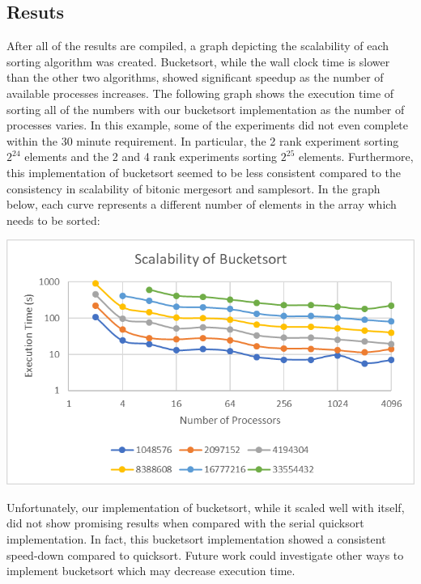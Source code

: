 \documentclass[10pt,letterpaper]{article}
\begin{document}
\begin{multicols}{2}
\section{Resuts}
After all of the results are compiled, a graph depicting the scalability of each sorting algorithm was created. Bucketsort, while the wall clock time is slower than the other two algorithms, showed significant speedup as the number of available processes increases. The following graph shows the execution time of sorting all of the numbers with our bucketsort implementation as the number of processes varies. In this example, some of the experiments did not even complete within the 30 minute requirement. In particular, the 2 rank experiment sorting $2^{24}$ elements and the 2 and 4 rank experiments sorting $2^{25}$ elements. Furthermore, this implementation of bucketsort seemed to be less consistent compared to the consistency in scalability of bitonic mergesort and samplesort. In the graph below, each curve represents a different number of elements in the array which needs to be sorted:

\begin{center}
\includegraphics[scale=1.3]{bucket_scale}
\end{center}

Unfortunately, our implementation of bucketsort, while it scaled well with itself, did not show promising results when compared with the serial quicksort implementation. In fact, this bucketsort implementation showed a consistent speed-down compared to quicksort. Future work could investigate other ways to implement bucketsort which may decrease execution time.


\end{multicols}
\end{document}
